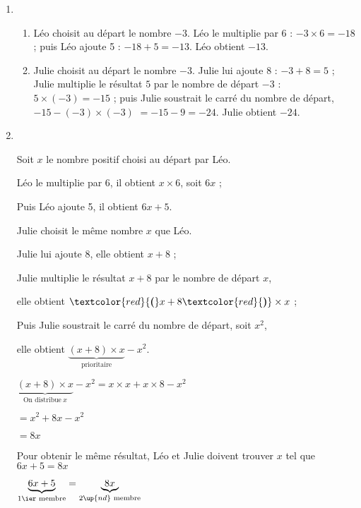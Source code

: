 
\begin{enumerate}
\item 
	\begin{enumerate}
		\item Léo choisit au départ le nombre $- 3$.
		Léo le multiplie par 6 : \quad $- 3 \times 6 = - 18$ ;
		puis Léo ajoute 5 : \quad  $- 18 + 5 = - 13$.
		Léo obtient $-13$.
		\item Julie choisit au départ le nombre $- 3$. Julie lui ajoute 8 : \quad  $- 3 + 8 = 5$ ;
Julie  multiplie le résultat $5$ par le nombre de départ $- 3$ : \quad  $5\times (-3)= - 15$ ;
puis Julie soustrait le carré du nombre de départ,   $-15 -(- 3)\times(- 3)$		$= - 15 - 9 =- 24$.
 Julie obtient $- 24$. 
\end{enumerate}
\pagebreak
\item ~

\vspace{-0.34cm}
\begin{minipage}{7cm}
Soit $x$ le nombre positif choisi au départ par Léo.

Léo le multiplie par 6, il obtient $x\times 6$, soit $6x$ ;

Puis Léo ajoute 5, il obtient $6x+5$.

\vspace{4cm}
\end{minipage}
\vline \hspace{0.5cm}\begin{minipage}{7cm}
Julie choisit le même nombre $x$ que Léo.

Julie lui ajoute 8, elle obtient $x+8$ ;

Julie  multiplie le résultat $x + 8$ par le nombre de départ $x$,

elle obtient $\textcolor{red}{\textbf{(}} x+8 \textcolor{red}{\textbf{)}} \times x$ ;

Puis Julie soustrait le carré du nombre de départ, soit $x^2$,

elle obtient $\underbrace{(x+8) \times x}_{\text{prioritaire}} - x^2$.

$\underbrace{(x+8) \times x}_{\text{On distribue}~x} - x^2=x\times x + x\times 8- x^2$

$= x^2 + 8x- x^2$

$= 8x$
\end{minipage}

Pour obtenir le même résultat, Léo et Julie doivent trouver $x$ tel que  $6x + 5 = 8x$

$\underbrace{6x+5}_{\text{1\ier\ membre}}=\underbrace{8x}_{\text{2$\up{nd}$ membre}}$


\end{enumerate}
